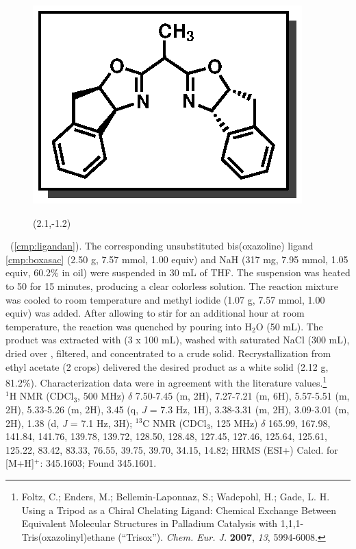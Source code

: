 \pagebreak
\begin{figure}
  \vspace{-18pt}
  \begin{center}
    \includegraphics[scale=0.8]{chp_asymmetric/images/ligandan}
     \begin{textblock}{1}(2.1,-1.2)  \end{textblock}
  \end{center}
  \vspace{-30pt}
\end{figure}
\noindent \textbf{\CMPligandan}\ (\ref{cmp:ligandan}). The corresponding unsubstituted
bis(oxazoline) ligand \ref{cmp:boxasac} (2.50 g, 7.57 mmol, 1.00 equiv) and
NaH (317 mg, 7.95 mmol, 1.05 equiv, 60.2\% in oil) were suspended in 30 mL of THF. The suspension was heated to 50 \degc for
15 minutes, producing a clear colorless solution. The reaction mixture was cooled to room temperature and methyl iodide (1.07 g,
7.57 mmol, 1.00 equiv) was added. After allowing to stir for an additional hour at room temperature,
the reaction was quenched by pouring into H$_2$O (50 mL). The product was extracted with 
(3 x 100 mL), washed with saturated NaCl (300 mL), dried over , filtered, and
concentrated to a crude solid. Recrystallization from ethyl acetate (2 crops) delivered the desired
product as a white solid (2.12 g, 81.2\%). Characterization data were in agreement with the
literature values.\footnote{{\frenchspacing Foltz, C.; Enders, M.; Bellemin-Laponnaz, S.; Wadepohl,
H.; Gade, L. H. Using a Tripod as a Chiral Chelating Ligand: Chemical Exchange Between Equivalent
Molecular Structures in Palladium Catalysis with 1,1,1-Tris(oxazolinyl)ethane (``Trisox''). \textit{Chem. Eur. J.} \textbf{2007}, \textit{13}, 5994-6008.}} \\
$^1$H NMR (CDCl$_3$, 500 MHz) $\delta$ 7.50-7.45 (m, 2H), 7.27-7.21 (m, 6H), 5.57-5.51 (m, 2H),
5.33-5.26 (m, 2H), 3.45 (q, \textit{J} = 7.3 Hz, 1H), 3.38-3.31 (m, 2H), 3.09-3.01 (m, 2H), 1.38 (d,
\textit{J} = 7.1 Hz, 3H); $^{13}$C NMR (CDCl$_3$, 125 MHz) $\delta$ 165.99, 167.98, 141.84, 141.76,
139.78, 139.72, 128.50, 128.48, 127.45, 127.46, 125.64, 125.61, 125.22, 83.42, 83.33, 76.55, 39.75, 39.70, 34.15, 14.82; HRMS (ESI+) Calcd.
for  [M+H]$^+$: 345.1603; Found 345.1601.

